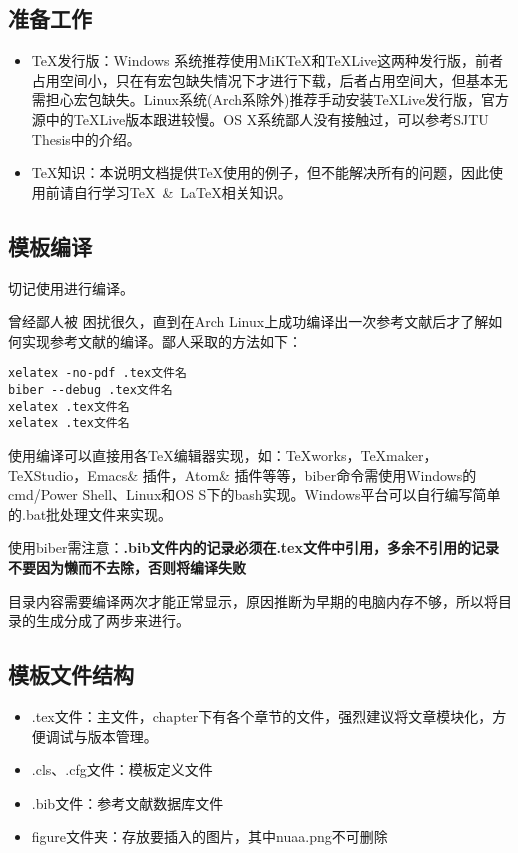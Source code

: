 \subsection{准备工作}
\begin{itemize}
  \item \TeX 发行版：Windows 系统推荐使用MiKTeX和\TeX Live这两种发行版，前者占用空间小，只在有宏包缺失情况下才进行下载，后者占用空间大，但基本无需担心宏包缺失。Linux系统(Arch系除外)推荐手动安装\TeX Live发行版，官方源中的TeXLive版本跟进较慢。OS X系统鄙人没有接触过，可以参考SJTU Thesis中的介绍。
  \item \TeX 知识：本说明文档提供\TeX 使用的例子，但不能解决所有的问题，因此使用前请自行学习\TeX~\&~\LaTeX 相关知识。
\end{itemize}

\subsection{模板编译}

切记使用\XeLaTeX 进行编译。

曾经鄙人被 困扰很久，直到在Arch Linux上成功编译出一次参考文献后才了解如何实现参考文献的编译。鄙人采取的方法如下：
\begin{lstlisting}[basicstyle=\small\ttfamily, caption=手动逐次编译, numbers=none]
xelatex -no-pdf .tex文件名
biber --debug .tex文件名
xelatex .tex文件名
xelatex .tex文件名
\end{lstlisting}

使用\XeLaTeX 编译可以直接用各\TeX 编辑器实现，如：TeXworks，TeXmaker，TeXStudio，Emacs\& 插件，Atom\& 插件等等，biber命令需使用Windows的cmd/Power Shell、Linux和OS S下的bash实现。Windows平台可以自行编写简单的.bat批处理文件来实现。

使用biber需注意：\textbf{.bib文件内的记录必须在.tex文件中引用，多余不引用的记录不要因为懒而不去除，否则将编译失败}

目录内容需要编译两次才能正常显示，原因推断为早期的电脑内存不够，所以将目录的生成分成了两步来进行。

\subsection{模板文件结构}
\begin{itemize}[noitemsep,topsep=0pt,parsep=0pt,partopsep=0pt]
  \item .tex文件：主文件，chapter下有各个章节的文件，强烈建议将文章模块化，方便调试与版本管理。
  \item .cls、.cfg文件：模板定义文件
  \item .bib文件：参考文献数据库文件
  \item figure文件夹：存放要插入的图片，其中nuaa.png不可删除
\end{itemize}
